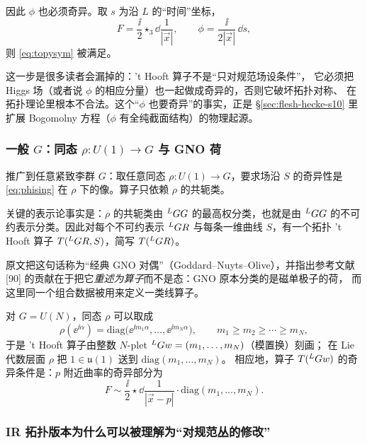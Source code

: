 因此 $\phi$ 也必须奇异。取 $s$ 为沿 $L$ 的“时间”坐标，
\begin{equation}
F=\frac{\ii}{2}\star_3\dd\frac{1}{|\vec x|},
\qquad
\phi=\frac{\ii}{2|\vec x|}\,\dd s,
\label{eq:phising}
\end{equation}
则 \eqref{eq:topysym} 被满足。\pA{}

这一步是很多读者会漏掉的：'t Hooft{} 算子不是“只对规范场设条件”，
它必须把 Higgs 场（或者说 $\phi$ 的相应分量）也一起做成奇异的，否则它破坏拓扑对称、
在拓扑理论里根本不合法。这个“$\phi$ 也要奇异”的事实，正是 §\ref{sec:flesh-hecke-s10}
里扩展 Bogomolny 方程（$\phi$ 有全纯截面结构）的物理起源。\pB{}

\subsubsection{一般 $G$：同态 $\rho:U(1)\to G$ 与 GNO 荷}

推广到任意紧致李群 $G$：取任意同态 $\rho:U(1)\to G$，要求场沿 $S$ 的奇异性是
\eqref{eq:phising} 在 $\rho$ 下的像。算子只依赖 $\rho$ 的共轭类。\pA{}

关键的表示论事实是：$\rho$ 的共轭类由 ${}^{L}G G$ 的最高权分类，也就是由 ${}^{L}G G$
的不可约表示分类。因此对每个不可约表示 ${}^{L}G R$ 与每条一维曲线 $S$，有一个拓扑
't Hooft{} 算子 $T({}^{L}G R,S)$，简写 $T({}^{L}G R)$。\pA{}

原文把这句话称为“经典 GNO 对偶”（Goddard--Nuyts--Olive），并指出参考文献
[90] 的贡献在于把它\emph{重述为算子}而不是态：GNO 原本分类的是磁单极子的荷，
而这里同一个组合数据被用来定义一类线算子。\pA{}

对 $G=U(N)$，同态 $\rho$ 可以取成
\begin{equation}
\rho(\ee^{\ii\alpha})=\mathrm{diag}\bigl(\ee^{\ii m_1\alpha},\dots,\ee^{\ii m_N\alpha}\bigr),
\qquad m_1\ge m_2\ge\cdots\ge m_N,
\label{eq:rhoUN}
\end{equation}
于是 't Hooft{} 算子由整数 $N$-plet ${}^{L}G w=(m_1,\dots,m_N)$（模置换）刻画；
在 Lie 代数层面 $\rho$ 把 $1\in\mathfrak{u}(1)$ 送到 $\mathrm{diag}(m_1,\dots,m_N)$。\pA{}
相应地，算子 $T({}^{L}G w)$ 的奇异条件是：$p$ 附近曲率的奇异部分为
\begin{equation}
F\sim\frac{\ii}{2}\star\dd\frac{1}{|\vec x-p|}\cdot\mathrm{diag}(m_1,\dots,m_N).
\label{eq:Fdiag}
\end{equation}
\pA{}

\subsubsection{IR 拓扑版本为什么可以被理解为“对规范丛的修改”}

